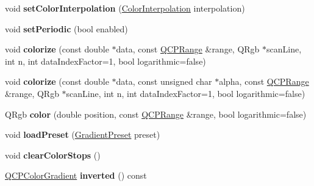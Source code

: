 \begin{DoxyCompactItemize}
\item 
void {\bfseries set\+Color\+Interpolation} (\hyperlink{class_q_c_p_color_gradient_ac5dca17cc24336e6ca176610e7f77fc1}{Color\+Interpolation} interpolation)\hypertarget{class_q_c_p_color_gradient_aa13fda86406e1d896a465a409ae63b38}{}\label{class_q_c_p_color_gradient_aa13fda86406e1d896a465a409ae63b38}

\item 
void {\bfseries set\+Periodic} (bool enabled)\hypertarget{class_q_c_p_color_gradient_a39d6448155fc00a219f239220d14bb39}{}\label{class_q_c_p_color_gradient_a39d6448155fc00a219f239220d14bb39}

\item 
void {\bfseries colorize} (const double $\ast$data, const \hyperlink{class_q_c_p_range}{Q\+C\+P\+Range} \&range, Q\+Rgb $\ast$scan\+Line, int n, int data\+Index\+Factor=1, bool logarithmic=false)\hypertarget{class_q_c_p_color_gradient_aaf423ceb943e177b0ed2c48c811d83dc}{}\label{class_q_c_p_color_gradient_aaf423ceb943e177b0ed2c48c811d83dc}

\item 
void {\bfseries colorize} (const double $\ast$data, const unsigned char $\ast$alpha, const \hyperlink{class_q_c_p_range}{Q\+C\+P\+Range} \&range, Q\+Rgb $\ast$scan\+Line, int n, int data\+Index\+Factor=1, bool logarithmic=false)\hypertarget{class_q_c_p_color_gradient_acf0cc7fba83ef21f7b8d5d5258519db3}{}\label{class_q_c_p_color_gradient_acf0cc7fba83ef21f7b8d5d5258519db3}

\item 
Q\+Rgb {\bfseries color} (double position, const \hyperlink{class_q_c_p_range}{Q\+C\+P\+Range} \&range, bool logarithmic=false)\hypertarget{class_q_c_p_color_gradient_a0599545c859268b025d2060dea741cea}{}\label{class_q_c_p_color_gradient_a0599545c859268b025d2060dea741cea}

\item 
void {\bfseries load\+Preset} (\hyperlink{class_q_c_p_color_gradient_aed6569828fee337023670272910c9072}{Gradient\+Preset} preset)\hypertarget{class_q_c_p_color_gradient_aa0aeec1528241728b9671bf8e60b1622}{}\label{class_q_c_p_color_gradient_aa0aeec1528241728b9671bf8e60b1622}

\item 
void {\bfseries clear\+Color\+Stops} ()\hypertarget{class_q_c_p_color_gradient_a939213e85f0d1279519d555c5fcfb6ad}{}\label{class_q_c_p_color_gradient_a939213e85f0d1279519d555c5fcfb6ad}

\item 
\hyperlink{class_q_c_p_color_gradient}{Q\+C\+P\+Color\+Gradient} {\bfseries inverted} () const \hypertarget{class_q_c_p_color_gradient_abe04e1d1ccab3d7aa78f2924faed4916}{}\label{class_q_c_p_color_gradient_abe04e1d1ccab3d7aa78f2924faed4916}

\end{DoxyCompactItemize}
